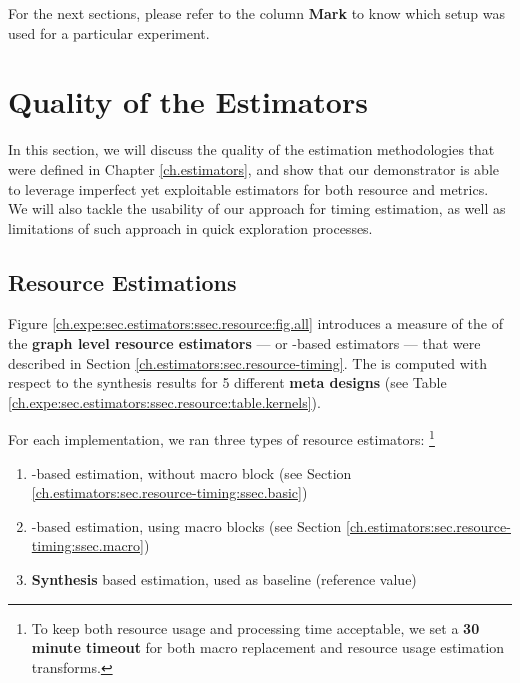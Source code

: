     For the next sections, please refer to the column {\bf Mark} to know which setup was used for a particular experiment.


\section{Quality of the Estimators}
\label{ch.expe:sec.estimators}

    In this section, we will discuss the quality of the estimation methodologies that were defined in Chapter \ref{ch.estimators}, and show that our demonstrator is able to leverage imperfect yet exploitable estimators for both resource and  metrics.
    We will also tackle the usability of our approach for timing estimation, as well as limitations of such approach in quick exploration processes.

    \subsection{Resource Estimations}
    \label{ch.expe:sec.estimators:ssec.resource}

        Figure \ref{ch.expe:sec.estimators:ssec.resource:fig.all} introduces a measure of the  of the {\bf graph level resource estimators} --- or \firrtl-based estimators --- that were described in Section \ref{ch.estimators:sec.resource-timing}.
        The  is computed with respect to the synthesis results for 5 different {\bf meta designs} (see Table \ref{ch.expe:sec.estimators:ssec.resource:table.kernels}).

        For each implementation, we ran three types of resource estimators:%
        \footnote{To keep both resource usage and processing time acceptable, we set a {\bf 30 minute timeout} for both macro replacement and resource usage estimation transforms.}
        \begin{enumerate}
            \setlength\itemsep{-.3em}
            \item \firrtl-based estimation, without macro block (see Section \ref{ch.estimators:sec.resource-timing:ssec.basic})
            \item \firrtl-based estimation, using macro blocks (see Section \ref{ch.estimators:sec.resource-timing:ssec.macro})
            \item {\bf Synthesis} based estimation, used as baseline (\ie reference value)
        \end{enumerate}

